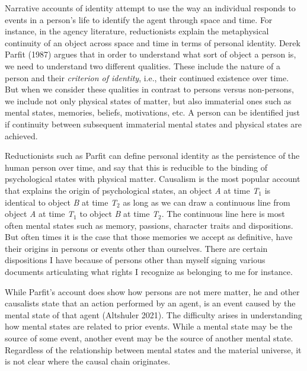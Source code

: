 \documentclass[
  letterpaper,
  DIV=11,
  numbers=noendperiod]{scrreprt}
\begin{document}
\begin{tcolorbox}[enhanced jigsaw, arc=.35mm, breakable, rightrule=.15mm, colback=white, colframe=quarto-callout-important-color-frame, bottomrule=.15mm, leftrule=.75mm, opacityback=0, toprule=.15mm, left=2mm]
\begin{tcolorbox}[enhanced jigsaw, arc=.35mm, breakable, rightrule=.15mm, colback=white, colframe=quarto-callout-tip-color-frame, bottomrule=.15mm, leftrule=.75mm, opacityback=0, toprule=.15mm, left=2mm]
Narrative accounts of identity attempt to use the way an individual
responds to events in a person's life to identify the agent through
space and time. For instance, in the agency literature, reductionists
explain the metaphysical continuity of an object across space and time
in terms of personal identity. Derek Parfit (1987) argues that in order
to understand what sort of object a person is, we need to understand two
different qualities. These include the nature of a person and their
\emph{criterion of identity}, i.e., their continued existence over time.
But when we consider these qualities in contrast to persons versus
non-persons, we include not only physical states of matter, but also
immaterial ones such as mental states, memories, beliefs, motivations,
etc. A person can be identified just if continuity between subsequent
immaterial mental states and physical states are achieved.

Reductionists such as Parfit can define personal identity as the
persistence of the human person over time, and say that this is
reducible to the binding of psychological states with physical matter.
Causalism is the most popular account that explains the origin of
psychological states, an object \emph{A} at time \emph{T\(_1\)} is
identical to object \emph{B} at time \emph{T\(_2\)} as long as we can
draw a continuous line from object \emph{A} at time \emph{T\(_1\)} to
object \emph{B} at time \emph{T\(_2\)}. The continuous line here is most
often mental states such as memory, passions, character traits and
dispositions. But often times it is the case that those memories we
accept as definitive, have their origins in persons or events other than
ourselves. There are certain dispositions I have because of persons
other than myself signing various documents articulating what rights I
recognize as belonging to me for instance.

While Parfit's account does show how persons are not mere matter, he and
other causalists state that an action performed by an agent, is an event
caused by the mental state of that agent (Altshuler 2021). The
difficulty arises in understanding how mental states are related to
prior events. While a mental state may be the source of some event,
another event may be the source of another mental state. Regardless of
the relationship between mental states and the material universe, it is
not clear where the causal chain originates.


\end{tcolorbox}
\end{tcolorbox}
\end{document}
